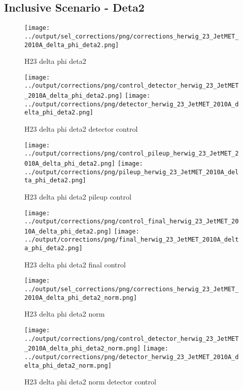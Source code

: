\documentclass[11pt]{book}
\begin{document}
\clearpage
\subsection{Inclusive Scenario - Deta2}

\begin{figure}[ht]
\centering
\texttt{[image: ../output/sel\_corrections/png/corrections\_herwig\_23\_JetMET\_2010A\_delta\_phi\_deta2.png]}
\caption{H23 delta phi deta2}
\label{fig:H23_JetMET_2010A_delta_phi_deta2}
\end{figure}


\begin{figure}[ht]
\centering
\texttt{[image: ../output/corrections/png/control\_detector\_herwig\_23\_JetMET\_2010A\_delta\_phi\_deta2.png]}
\texttt{[image: ../output/corrections/png/detector\_herwig\_23\_JetMET\_2010A\_delta\_phi\_deta2.png]}
\caption{H23 delta phi deta2 detector control}
\label{fig:H23_JetMET_2010A_delta_phi_deta2_detector_control}
\end{figure}

\begin{figure}[ht]
\centering
\texttt{[image: ../output/corrections/png/control\_pileup\_herwig\_23\_JetMET\_2010A\_delta\_phi\_deta2.png]}
\texttt{[image: ../output/corrections/png/pileup\_herwig\_23\_JetMET\_2010A\_delta\_phi\_deta2.png]}
\caption{H23 delta phi deta2 pileup control}
\label{fig:H23_JetMET_2010A_delta_phi_deta2_pileup_control}
\end{figure}


\begin{figure}[ht]
\centering
\texttt{[image: ../output/corrections/png/control\_final\_herwig\_23\_JetMET\_2010A\_delta\_phi\_deta2.png]}
\texttt{[image: ../output/corrections/png/final\_herwig\_23\_JetMET\_2010A\_delta\_phi\_deta2.png]}
\caption{H23 delta phi deta2 final control}
\label{fig:H23_JetMET_2010A_delta_phi_deta2_final_control}
\end{figure}


\begin{figure}[ht]
\centering
\texttt{[image: ../output/sel\_corrections/png/corrections\_herwig\_23\_JetMET\_2010A\_delta\_phi\_deta2\_norm.png]}
\caption{H23 delta phi deta2 norm}
\label{fig:H23_JetMET_2010A_delta_phi_deta2_norm}
\end{figure}

\begin{figure}[ht]
\centering
\texttt{[image: ../output/corrections/png/control\_detector\_herwig\_23\_JetMET\_2010A\_delta\_phi\_deta2\_norm.png]}
\texttt{[image: ../output/corrections/png/detector\_herwig\_23\_JetMET\_2010A\_delta\_phi\_deta2\_norm.png]}
\caption{H23 delta phi deta2 norm detector control}
\label{fig:H23_JetMET_2010A_delta_phi_deta2_norm_detector_control}
\end{figure}
\end{document}
